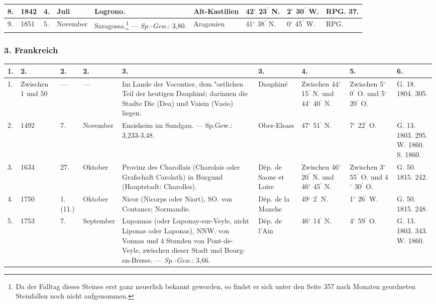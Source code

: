 \documentclass[a4paper, 8pt, oneside, polutonikogreek, german]{article}
\begin{document}
\begin{center}
\begin{longtable}{|p{3mm}|p{7mm}|p{5mm}|p{16mm}|p{25mm}|p{17mm}|p{13mm}|p{13mm}|p{13mm}|}
        8. & 1842 & 4. & Juli & Logrono. & Alt-Kastilien & 42$^\circ$ 23$^\prime$ N. & 2$^\circ$ 30$^\prime$ W. & RPG. 37. \\ \hline
        9. & 1851 & 5. & November & Saragossa.\footnote{Da der Falltag dieses Steines erst ganz neuerlich bekannt geworden, so findet er sich unter den Seite 357 nach Monaten geordneten Steinfallen noch nicht aufgenommen.} --- \emph{Sp.-Gew.}: 3,80. & Aragonien & 41$^\circ$ 38$^\prime$ N. & 0$^\circ$ 45$^\prime$ W. & RPG. \\ \hline
    \end{longtable}
\end{center}
\clearpage
\subsubsection{3. Frankreich}
\begin{center}
    \footnotesize
    \begin{longtable}{|p{3mm}|p{12mm}|p{5mm}|p{16mm}|p{25mm}|p{17mm}|p{13mm}|p{13mm}|p{13mm}|}
    \hline
        1. & 2. & 2. & 2. & 3. & 3. & 4. & 5. & 6. \\ \hline
        1. & Zwischen 1 und 50 & --- & --- & Im Lande der Vocontier, dem "ostlichen Teil der heutigen Dauphiné; darinnen die Stadte Die (Dea) und Vaisin (Vasio) liegen. & Dauphiné & Zwischen 44$^\circ$ 15$^\prime$ N. und 44$^\circ$ 40$^\prime$ N. & Zwischen 5$^\circ$ 0$^\prime$ O. und 5$^\circ$ 20$^\prime$ O. & G. 18. 1804. 305. \\ \hline
        2. & 1492 & 7. & November & Ensisheim im Sundgau. --- Sp.Gew.: 3,233-3,48. & Ober-Elsass & 47$^\circ$ 51$^\prime$ N. & 7$^\circ$ 22$^\prime$ O. & G. 13. 1803. 295. W. 1860. S. 1860. \\ \hline
        3. & 1634 & 27. & Oktober & Provinz des Charollais (Charolais oder Grafschaft Carolath) in Burgund (Hauptstadt: Charolles). & Dép. de Saone et Loire & Zwischen 46$^\circ$ 20$^\prime$ N. und 46$^\circ$ 45$^\prime$ N. & Zwischen 3$^\circ$ 55$^\prime$ O. und 4$^\circ$ 30$^\prime$ O. & G. 50. 1815. 242. \\ \hline
        4. & 1750 & 1. (11.) & Oktober & Nicor (Nicorps oder Niort), SO. von Coutance; Normandie. & Dép. de la Manche & 49$^\circ$ 2$^\prime$ N. & 1$^\circ$ 26$^\prime$ W. & G. 50. 1815. 248. \\ \hline
        5. & 1753 & 7. & September & Luponnas (oder Luponay-sur-Veyle, nicht Liponas oder Laponas), NNW. von Vonnas und 4 Stunden von Pont-de-Veyle, zwischen dieser Stadt und Bourg-en-Bresse. --- \emph{Sp.-Gew.}: 3,66. & Dép. de l’Ain & 46$^\circ$ 14$^\prime$ N. & 4$^\circ$ 59$^\prime$ O. & G. 13. 1803. 343. W. 1860. \\ \hline

\end{longtable}
\end{center}
\end{document}
